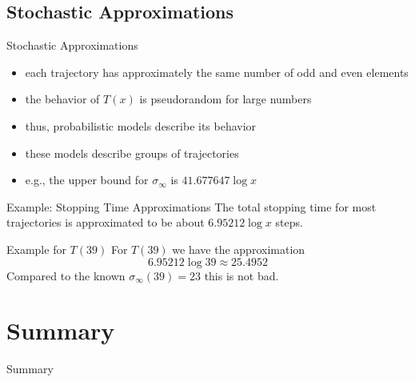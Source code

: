 \documentclass[hyperref={colorlinks,allcolors=black}]{beamer}
\begin{document}

\subsection[Approximations]{Stochastic Approximations}

\begin{frame}{Stochastic Approximations}
\begin{itemize}
    \item each trajectory has approximately the same number of odd and even 
        elements
    \item the behavior of $T(x)$ is pseudorandom for large numbers
    \item thus, probabilistic models describe its behavior
    \item these models describe groups of trajectories
    \item e.g., the upper bound for $\sigma_{\infty}$ is $41.677647 \log x$
\end{itemize}
\end{frame}


\begin{frame}{Example: Stopping Time Approximations}
The total stopping time for most trajectories is approximated to be about 
$6.95212 \log x$ steps.
\begin{block}{Example for $T(39)$}
For $T(39)$ we have the approximation
\begin{equation}\nonumber
    6.95212 \log 39 \approx 25.4952
\end{equation}
Compared to the known $\sigma_{\infty}(39)=23$ this is not bad.
\end{block}
\end{frame}


\section{Summary}

\begin{frame}{Summary}
\end{frame}


\end{document}
